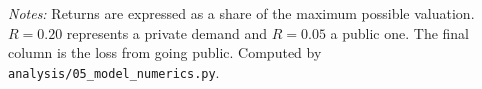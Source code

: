 \begin{table}[t]\centering\small
\caption{Incumbent's expected return by number of approved destinations ($F=U[0,1]$, $N=31$, $\beta=0.5$)}\label{tab:model}

\begin{minipage}{0.92\linewidth}\footnotesize\vspace{4pt}
\emph{Notes:} Returns are expressed as a share of the maximum possible valuation. $R=0.20$ represents a private demand and $R=0.05$ a public one. The final column is the loss from going public. Computed by \texttt{analysis/05\_model\_numerics.py}.
\end{minipage}
\end{table}
